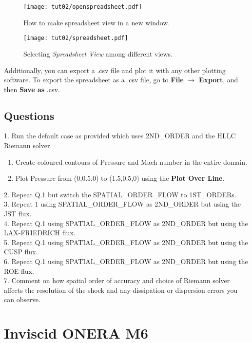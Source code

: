 \begin{figure}[htbp]
    \centering
    \texttt{[image: tut02/openspreadsheet.pdf]}
    \caption{How to make spreadsheet view in a new window.}
    \label{fig2:open_spreadsheet}
\end{figure}
\begin{figure}[htbp]
    \centering
    \texttt{[image: tut02/spreadsheet.pdf]}
    \caption{Selecting \textit{Spreadsheet View} among different views.}
    \label{fig2:spreadsheet}
\end{figure}
Additionally, you can export a .csv file and plot it with any other plotting software. To export the spreadsheet as a .csv file, go to \textbf{File} $\rightarrow$ \textbf{Export}, and then \textbf{Save as} .csv.
\clearpage
\section{Questions}
1. Run the default case as provided which uses 2ND\_ORDER and the HLLC Riemann solver.
\begin{enumerate}[label=(\alph*)]
    \item Create coloured contours of Pressure and Mach number in the entire domain.
    \item Plot Pressure from (0,0.5,0) to (1.5,0.5,0) using the \textbf{Plot Over Line}.
\end{enumerate}
2. Repeat Q.1 but switch the SPATIAL\_ORDER\_FLOW to 1ST\_ORDERs. \\
3. Repeat 1 using SPATIAL\_ORDER\_FLOW as 2ND\_ORDER but using the JST flux. \\
4. Repeat Q.1 using SPATIAL\_ORDER\_FLOW as 2ND\_ORDER but using the LAX-FRIEDRICH flux. \\
5. Repeat Q.1 using SPATIAL\_ORDER\_FLOW as 2ND\_ORDER but using the CUSP flux. \\
6. Repeat Q.1 using SPATIAL\_ORDER\_FLOW as 2ND\_ORDER but using the ROE flux. \\
7. Comment on how spatial order of accuracy and choice of Riemann solver affects the resolution of the shock and any dissipation or dispersion errors you can observe.
\chapter{Inviscid ONERA M6}
\label{ch:Inviscid ONERA M6}
